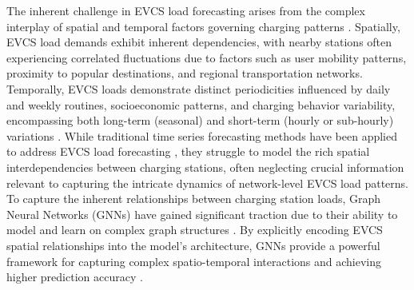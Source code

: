 \documentclass[lettersize,journal]{IEEEtran}
\begin{document}
 The inherent challenge in EVCS load forecasting arises from the complex interplay of spatial and temporal factors governing charging patterns \cite{9809785}.  Spatially, EVCS load demands exhibit inherent dependencies, with nearby stations often experiencing correlated fluctuations due to factors such as user mobility patterns, proximity to popular destinations, and regional transportation networks. Temporally, EVCS loads demonstrate distinct periodicities influenced by daily and weekly routines, socioeconomic patterns, and charging behavior variability, encompassing both long-term (seasonal) and short-term (hourly or sub-hourly) variations \cite{khan2023comparison}.  While traditional time series forecasting methods have been applied to address EVCS load forecasting \cite{journal/tte2024/10Wu}, they struggle to model the rich spatial interdependencies between charging stations, often neglecting crucial information relevant to capturing the intricate dynamics of network-level EVCS load patterns. To capture the inherent relationships between charging station loads, Graph Neural Networks (GNNs) have gained significant traction due to their ability to model and learn on complex graph structures \cite{conference/nips2020/33bai}. By explicitly encoding EVCS spatial relationships into the model's architecture, GNNs provide a powerful framework for capturing complex spatio-temporal interactions and achieving higher prediction accuracy \cite{journal/tsg2024/15Kim}. 
\end{document}
